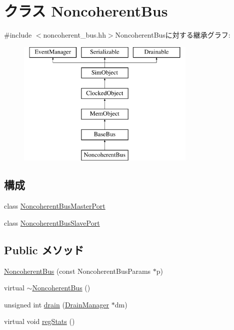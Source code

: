 \hypertarget{classNoncoherentBus}{
\section{クラス NoncoherentBus}
\label{classNoncoherentBus}
}


{\ttfamily \#include $<$noncoherent\_\-bus.hh$>$}NoncoherentBusに対する継承グラフ:\begin{figure}[H]
\begin{center}
\leavevmode
\includegraphics[height=6cm]{classNoncoherentBus}
\end{center}
\end{figure}
\subsection*{構成}
\begin{DoxyCompactItemize}
\item 
class \hyperlink{classNoncoherentBus_1_1NoncoherentBusMasterPort}{NoncoherentBusMasterPort}
\item 
class \hyperlink{classNoncoherentBus_1_1NoncoherentBusSlavePort}{NoncoherentBusSlavePort}
\end{DoxyCompactItemize}
\subsection*{Public メソッド}
\begin{DoxyCompactItemize}
\item 
\hyperlink{classNoncoherentBus_a12760c9f0ef395e273e820a9d1db9cd9}{NoncoherentBus} (const NoncoherentBusParams $\ast$p)
\item 
virtual \hyperlink{classNoncoherentBus_a80310b44cba4493123399310722fd6e6}{$\sim$NoncoherentBus} ()
\item 
unsigned int \hyperlink{classNoncoherentBus_aa8a18d230dba7a674ac8a0b4f35bc36a}{drain} (\hyperlink{classDrainManager}{DrainManager} $\ast$dm)
\item 
virtual void \hyperlink{classNoncoherentBus_a4dc637449366fcdfc4e764cdf12d9b11}{regStats} ()
\end{DoxyCompactItemize}
